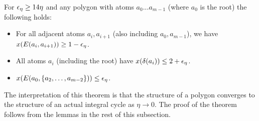 \begin{theorem}\label{thm:poly-structure}
For  ${\epsilon}_{\eta}\geq 14\eta$ and any polygon with atoms $a_0...a_{m-1}$ (where $a_0$ is the root) the following holds:
	\begin{itemize}
	\item For all adjacent atoms $a_i,a_{i+1}$ (also including $a_0,a_{m-1}$), we have $x(E(a_i,a_{i+1})) \ge 1-{\epsilon}_\eta$. 
	\item All atoms $a_i$ (including the root) have $x(\delta(a_i)) \le 2+{\epsilon}_\eta$. 
	\item $x(E(a_0, \{a_2,\dots,a_{m-2}\}))\leq {\epsilon}_{\eta}$.
	\end{itemize}
\end{theorem}
The interpretation of this theorem is that the structure of a polygon converges to the structure of an actual integral cycle as $\eta\to 0$. 
The proof of the theorem follows from the lemmas in the rest of this subsection.






